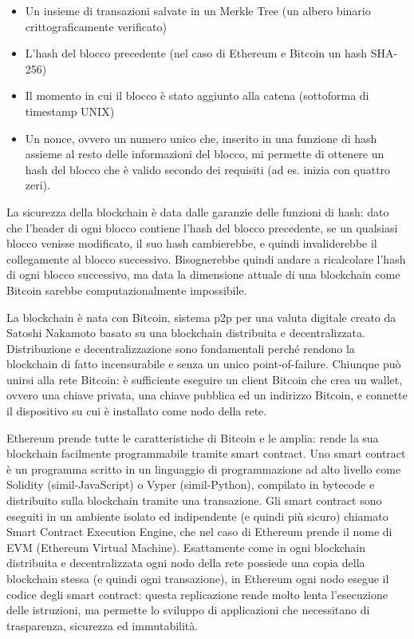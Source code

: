 \begin{itemize}
    \item Un insieme di transazioni salvate in un Merkle Tree (un albero binario crittograficamente verificato)
    \item L'hash del blocco precedente (nel caso di Ethereum e Bitcoin un hash SHA-256)
    \item Il momento in cui il blocco è stato aggiunto alla catena (sottoforma di timestamp UNIX)
    \item Un nonce, ovvero un numero unico che, inserito in una funzione di hash assieme al resto delle informazioni del blocco,
    mi permette di ottenere un hash del blocco che è valido secondo dei requisiti (ad es. inizia con quattro zeri).
\end{itemize}

La sicurezza della blockchain è data dalle garanzie delle funzioni di hash: dato che l'header di ogni blocco contiene l'hash del blocco precedente,
se un qualsiasi blocco venisse modificato, il suo hash cambierebbe, e quindi invaliderebbe il collegamente al blocco successivo. Bisognerebbe quindi
andare a ricalcolare l'hash di ogni blocco successivo, ma data la dimensione attuale di una blockchain come Bitcoin sarebbe computazionalmente
impossibile.

La blockchain è nata con Bitcoin, sistema p2p per una valuta digitale creato da Satoshi Nakamoto basato su una blockchain distribuita e decentralizzata. 
Distribuzione e decentralizzazione sono fondamentali perché rendono la blockchain di fatto incensurabile
e senza un unico point-of-failure. Chiunque può unirsi alla rete Bitcoin: è sufficiente eseguire un client Bitcoin che crea un wallet, ovvero
una chiave privata, una chiave pubblica ed un indirizzo Bitcoin, e connette il dispositivo su cui è installato come nodo della rete.

Ethereum prende tutte le caratteristiche di Bitcoin e le amplia: rende la sua blockchain facilmente programmabile tramite smart contract.
Uno smart contract è un programma scritto in un linguaggio di programmazione ad alto
livello come Solidity (simil-JavaScript) o Vyper (simil-Python), compilato in bytecode e distribuito sulla blockchain tramite
una transazione. 
Gli smart contract sono eseguiti in un ambiente isolato ed indipendente (e quindi più sicuro)
chiamato Smart Contract Execution Engine, che nel caso di Ethereum prende il nome di EVM (Ethereum Virtual Machine).
Esattamente come in ogni blockchain distribuita e decentralizzata ogni nodo della rete possiede una copia della blockchain stessa
(e quindi ogni transazione), in Ethereum ogni nodo esegue il codice degli smart contract: questa replicazione rende molto lenta
l’esecuzione delle istruzioni, ma permette lo sviluppo di applicazioni che necessitano di trasparenza, sicurezza ed immutabilità.

